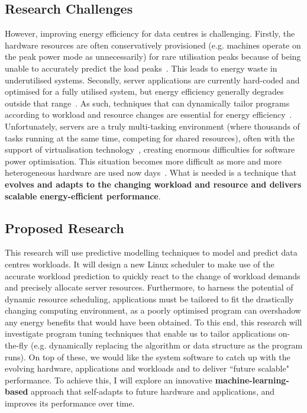 \subsection{Research Challenges}
However, improving energy efficiency for data centres is challenging. Firstly, the hardware resources are often conservatively provisioned (e.g. machines operate on the peak power mode as unnecessarily)  for rare utilisation peaks because of being unable to accurately predict the load peaks~\cite{energy-aware,towardsenergyeff}. This leads to energy waste in underutilised systems. Secondly, server applications are currently hard-coded and optimised for a fully utilised system, but energy efficiency generally degrades outside that range~\cite{towardsenergyeff,autodatacentre}. As such, techniques that can dynamically tailor programs according to workload and resource changes are essential for energy efficiency~\cite{towardsenergyeff}. Unfortunately, servers are a truly multi-tasking environment (where thousands of tasks running at the same time, competing for shared resources), often with the support of virtualisation technology~\cite{energy-effcloud}, creating enormous difficulties for software power optimisation. This situation becomes more difficult as more and more heterogeneous hardware are used now days~\cite{aview}. What is needed is a technique that \textbf{evolves and adapts to the changing workload and resource and delivers scalable energy-efficient performance}.

\subsection{Proposed Research}
This research will use predictive modelling techniques to model and predict data centres workloads. It will design a new Linux scheduler to make use of the accurate workload prediction to quickly react to the change of workload demands and precisely allocate server resources.  Furthermore, to harness the potential of dynamic resource scheduling, applications must be tailored to fit the drastically changing computing environment, as a poorly optimised program can overshadow any energy benefits that would have been obtained. To this end, this research will investigate program tuning techniques that enable us to tailor applications on-the-fly (e.g. dynamically replacing the algorithm or data structure as the program runs). On top of these, we would like the system software to catch up with the evolving hardware, applications and workloads and to deliver ``future scalable" performance. To achieve this, I will explore an innovative \textbf{machine-learning-based} approach that self-adapts to future hardware and applications, and improves its performance over time.

